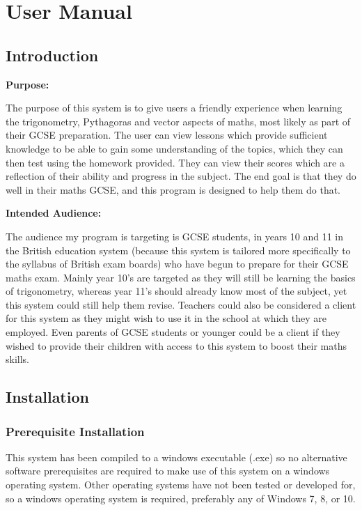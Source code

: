 \chapter{User Manual}

\section{Introduction}

\textbf{Purpose: }

The purpose of this system is to give users a friendly experience when learning the trigonometry, Pythagoras and vector aspects of maths, most likely as part of their GCSE preparation. The user can view lessons which provide sufficient knowledge to be able to gain some understanding of the topics, which they can then test using the homework provided. They can view their scores which are a reflection of their ability and progress in the subject. The end goal is that they do well in their maths GCSE, and this program is designed to help them do that.

\textbf{Intended Audience: }

The audience my program is targeting is GCSE students, in years 10 and 11 in the British education system (because this system is tailored more specifically to the syllabus of British exam boards) who have begun to prepare for their GCSE maths exam. Mainly year 10's are targeted as they will still be learning the basics of trigonometry, whereas year 11's should already know most of the subject, yet this system could still help them revise. Teachers could also be considered a client for this system as they might wish to use it in the school at which they are employed. Even parents of GCSE students or younger could be a client if they wished to provide their children with access to this system to boost their maths skills.

\section{Installation}

\subsection{Prerequisite Installation}

This system has been compiled to a windows executable (.exe) so no alternative software prerequisites are required to make use of this system on a windows operating system. Other operating systems have not been tested or developed for, so a windows operating system is required, preferably any of Windows 7, 8, or 10.

